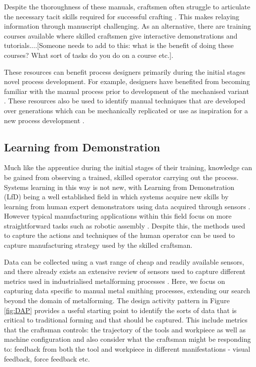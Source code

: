 Despite the thoroughness of these manuals, craftsmen often struggle to articulate the necessary tacit skills required for successful crafting \citep{Wood2009ACraftsmen}. This makes relaying information through manuscript challenging. As an alternative, there are training courses available where skilled craftsmen give interactive demonstrations and tutorials....[Someone needs to add to this: what is the benefit of doing these courses? What sort of tasks do you do on a course etc.].

These resources can benefit process designers primarily during the initial stages novel process development. For example, designers have benefited from becoming familiar with the manual process prior to development of the mechanised variant \citep{Ilangovan2016AnForming}. These resources also be used to identify manual techniques that are developed over generations which can be mechanically replicated \citep{Allwood2019Folding-shearing:Change} or use as inspiration for a new process development \citep{Russo2020RaisingSpinning}.


\subsection{Learning from Demonstration} \label{sec:LfD} 
Much like the apprentice during the initial stages of their training, knowledge can be gained from observing a trained, skilled operator carrying out the process. Systems learning in this way is not new, with Learning from Demonstration (LfD) being a well established field in which systems acquire new skills by learning from human expert demonstrators using data acquired through sensors \citep{Ravichandar2020RecentDemonstration}. However typical manufacturing applications within this field focus on more straightforward tasks such as robotic assembly \citep{Zhu2018RobotSurvey}. Despite this, the methods used to capture the actions and techniques of the human operator can be used to capture manufacturing strategy used by the skilled craftsman.

Data can be collected using a vast range of cheap and readily available sensors, and there already exists an extensive review of sensors used to capture different metrics used in industrialised metalforming processes \citep{Allwood2016Closed-loopForming}. Here, we focus on capturing data specific to manual metal smithing processes, extending our search beyond the domain of metalforming. The design activity pattern in Figure \ref{fig:DAP} provides a useful starting point to identify the sorts of data that is critical to traditional forming and that should be captured. This include metrics that the craftsman controls: the trajectory of the tools and workpiece as well as machine configuration and also consider what the craftsman might be responding to: feedback from both the tool and workpiece in different manifestations - visual feedback, force feedback etc. 

